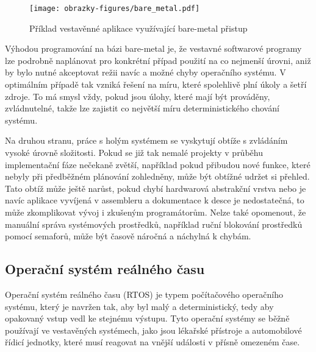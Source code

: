 \begin{figure}[h]
    \centering
    \texttt{[image: obrazky-figures/bare\_metal.pdf]}
    
    \caption{Příklad vestavěnné aplikace využívající bare-metal přistup}
    \label{fig:bare-metal}
\end{figure}

\newpage

Výhodou programování na bázi bare-metal je, že vestavné softwarové programy lze podrobně naplánovat pro konkrétní případ použití na co nejmenší úrovni, aniž by bylo nutné akceptovat režii navíc a možné chyby operačního systému. V optimálním případě tak vzniká řešení na míru, které spolehlivě plní úkoly a šetří zdroje. To má smysl vždy, pokud jsou úlohy, které mají být prováděny, zvládnutelné, takže lze zajistit co největší míru deterministického chování systému. \cite{sysgo_baremetal_vs_rtos}

Na druhou stranu, práce s holým systémem se vyskytují obtíže s zvládáním vysoké úrovně složitosti. Pokud se již tak nemalé projekty v průběhu implementační fáze nečekaně zvětší, například pokud přibudou nové funkce, které nebyly při předběžném plánování zohledněny, může být obtížné udržet si přehled. Tato obtíž může ještě narůst, pokud chybí hardwarová abstrakční vrstva nebo je navíc aplikace vyvíjená v assembleru a dokumentace k desce je nedostatečná, to může zkomplikovat vývoj i zkušeným programátorům. Nelze také opomenout, že manuální správa systémových prostředků, například ruční blokování prostředků pomocí semaforů, může být časově náročná a náchylná k chybám. \cite{sysgo_baremetal_vs_rtos}

\subsection{Operační systém reálného času}
Operační systém reálného času (RTOS) je typem počítačového operačního systému, který je navržen tak, aby byl malý a deterministický, tedy aby opakovaný vstup vedl ke stejnému výstupu. Tyto operační systémy se běžně používají ve vestavěných systémech, jako jsou lékařské přístroje a automobilové řídicí jednotky, které musí reagovat na vnější události v přísně omezeném čase. \cite{freertos_what_is_rtos}

